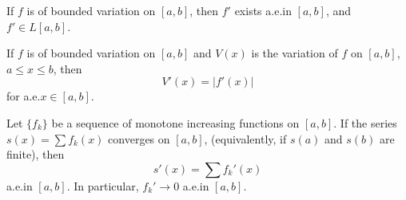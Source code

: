 
\begin{corollary}[7.23]
If $f$ is of bounded variation on $[a,b]$, then $f'$ exists a.e.\@ in
$[a,b]$, and $f'\in L[a,b]$.
\end{corollary}

\begin{theorem}[7.24]
If $f$ is of bounded variation on $[a,b]$ and $V(x)$ is the variation of
$f$ on $[a,b]$, $a\leq x\leq b$, then
\[
V'(x)=|f'(x)|
\]
for a.e.\@ $x\in[a,b]$.
\end{theorem}
\begin{lemma}[7.25, Fubini]
Let $\{f_k\}$ be a sequence of monotone increasing functions on $[a,b]$. If
the series $s(x)=\sum f_k(x)$ converges on $[a,b]$, (equivalently, if
$s(a)$ and $s(b)$ are finite), then
\[
s'(x)=\sum f_k'(x)
\]
a.e.\@ in $[a,b]$. In particular, $f_k'\to 0$ a.e.\@ in $[a,b]$.
\end{lemma}


